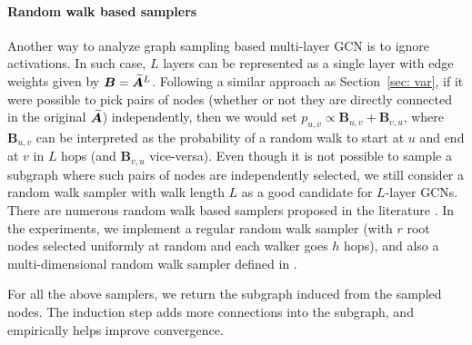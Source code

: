 \paragraph{Random walk based samplers} 
Another way to analyze graph sampling based multi-layer GCN is to ignore activations. In such case, $L$ layers can be represented as a single layer with edge weights given by $\bm{B} = \Anorm^L$. Following a similar approach as Section~\ref{sec: var}, if it were possible to pick pairs of nodes (whether or not they are directly connected in the original $\Anorm$) independently, then we would set $p_{u, v} \propto \bm{B}_{u,v} + \bm{B}_{v,u}$, where $\bm{B}_{u, v}$ can be interpreted as the probability of a random walk to start at $u$ and end at $v$ in $L$ hops (and $\bm{B}_{v, u}$ vice-versa). Even though it is not possible to sample a subgraph where such pairs of nodes are independently selected, we still consider a random walk sampler with walk length $L$ as a good candidate  for $L$-layer GCNs. There are numerous random walk based samplers proposed in the literature \citep{frontier,forest-fire,sampler_survey, sampler_icde}. 
In the experiments, we implement a regular random walk sampler (with $r$ root nodes selected uniformly at random and each walker goes $h$ hops), and also a multi-dimensional random walk sampler defined in \cite{frontier}.




For all the above samplers, we return the subgraph induced from the sampled nodes. The induction step adds more connections into the subgraph, and empirically helps improve convergence. 

